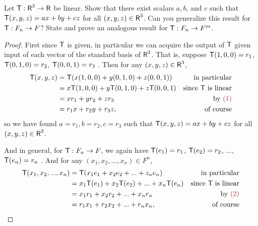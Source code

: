 \begin{exercise} \label{exercise 2.1.22}
Let \(\textsf{T}: \textsf{R}^3 \to \textsf{R}\) be linear.
Show that there exist scalars \(a, b\), and \(c\) such that \(\textsf{T}(x, y, z) = ax + by + cz\) for all \((x, y, z) \in \textsf{R}^3\).
Can you generalize this result for \(\textsf{T}: F_n \to F\)?
State and prove an analogous result for \(\textsf{T}: F_n \to F^m\).
\end{exercise}

\begin{proof}
First since \(\textsf{T}\) is given, in particular we can acquire the output of \(\textsf{T}\) given input of each vector of the standard basis of \(\textsf{R}^3\).
That is, suppose \(\textsf{T}(1, 0, 0) = r_1\), \(\textsf{T}(0, 1, 0) = r_2\), \(\textsf{T}(0, 0, 1) = r_3\) .
Then for any \((x, y, z) \in \textsf{R}^3\),
\begin{align*}
    \T(x, y, z) & = \T(x(1, 0, 0) + y(0, 1, 0) + z(0, 0, 1)) & \text{in particular} \\
                & = x\T(1, 0, 0) + y\T(0, 1, 0) + z\T(0, 0, 1) & \text{since \(\T\) is linear} \\
                & = x r_1 + y r_2 + z r_3 & \text{by \MAROON{(1)}} \\
                & = r_1 x + r_2 y + r_3 z, & \text{of course}
\end{align*}
so we have found \(a = r_1, b = r_2, c = r_3\) such that \(\textsf{T}(x, y, z) = ax + by + cz\) for all \((x, y, z) \in \textsf{R}^3\).

And in general, for \(\textsf{T}: F_n \to F\), we again have \(\textsf{T}(e_1) = r_1\), \(\textsf{T}(e_2) = r_2\), ..., \(\textsf{T}(e_n) = r_n\) .
And for any \((x_1, x_2, ..., x_n) \in F^n\),
\begin{align*}
    \T(x_1, x_2, ..., x_n) & = \T(x_1 e_1 + x_2 e_2 + ... + z_n e_n) & \text{in particular} \\
                & = x_1\T(e_1) + x_2\T(e_2) + ... + x_n\T(e_n) & \text{since \(\T\) is linear} \\
                & = x_1 r_1 + x_2 r_2 + ... + x_n r_n & \text{by \MAROON{(2)}} \\
                & = r_1 x_1 + r_2 x_2 + ... + r_n x_n, & \text{of course}
\end{align*}


\end{proof}
